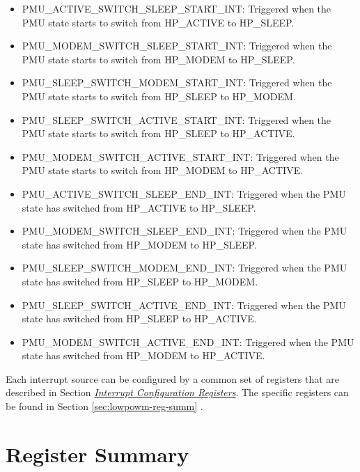\documentclass[main\_\_EN.tex]{subfiles}
\begin{document}
\begin{itemize}
\item \label{int:PMUACTIVESWITCHSLEEPSTARTINT}PMU\_ACTIVE\_SWITCH\_SLEEP\_START\_INT: Triggered when the PMU state starts to switch from HP\_ACTIVE to HP\_SLEEP.
\item \label{int:PMUMODEMSWITCHSLEEPSTARTINT}PMU\_MODEM\_SWITCH\_SLEEP\_START\_INT: Triggered when the PMU state starts to switch from HP\_MODEM to HP\_SLEEP.
\item \label{int:PMUSLEEPSWITCHMODEMSTARTINT}PMU\_SLEEP\_SWITCH\_MODEM\_START\_INT: Triggered when the PMU state starts to switch from HP\_SLEEP to HP\_MODEM.
\item \label{int:PMUSLEEPSWITCHACTIVESTARTINT}PMU\_SLEEP\_SWITCH\_ACTIVE\_START\_INT: Triggered when the PMU state starts to switch from HP\_SLEEP to HP\_ACTIVE.
\item \label{int:PMUMODEMSWITCHACTIVESTARTINT}PMU\_MODEM\_SWITCH\_ACTIVE\_START\_INT: Triggered when the PMU state starts to switch from HP\_MODEM to HP\_ACTIVE.
\item \label{int:PMUACTIVESWITCHSLEEPENDINT}PMU\_ACTIVE\_SWITCH\_SLEEP\_END\_INT: Triggered when the PMU state has switched from HP\_ACTIVE to HP\_SLEEP.
\item \label{int:PMUMODEMSWITCHSLEEPENDINT}PMU\_MODEM\_SWITCH\_SLEEP\_END\_INT: Triggered when the PMU state has switched from  HP\_MODEM to HP\_SLEEP.
\item \label{int:PMUSLEEPSWITCHMODEMENDINT}PMU\_SLEEP\_SWITCH\_MODEM\_END\_INT: Triggered when the PMU state has switched from  HP\_SLEEP to HP\_MODEM.
\item \label{int:PMUSLEEPSWITCHACTIVEENDINT}PMU\_SLEEP\_SWITCH\_ACTIVE\_END\_INT: Triggered when the PMU state has switched from HP\_SLEEP to HP\_ACTIVE.
\item \label{int:PMUMODEMSWITCHACTIVEENDINT}PMU\_MODEM\_SWITCH\_ACTIVE\_END\_INT: Triggered when the PMU state has switched from HP\_MODEM to HP\_ACTIVE.
\end{itemize}

Each interrupt source can be configured by a common set of registers that are described in Section \hyperref[interrupt-config-registers]{\textit{Interrupt Configuration Registers}}. The specific registers can be found in Section \ref{sec:lowpowm-reg-summ} \textit{}.

\newpage
\section{Register Summary}\hypertarget{lowpowm-reg-summ}{}\label{sec:lowpowm-reg-summ}
\end{document}
